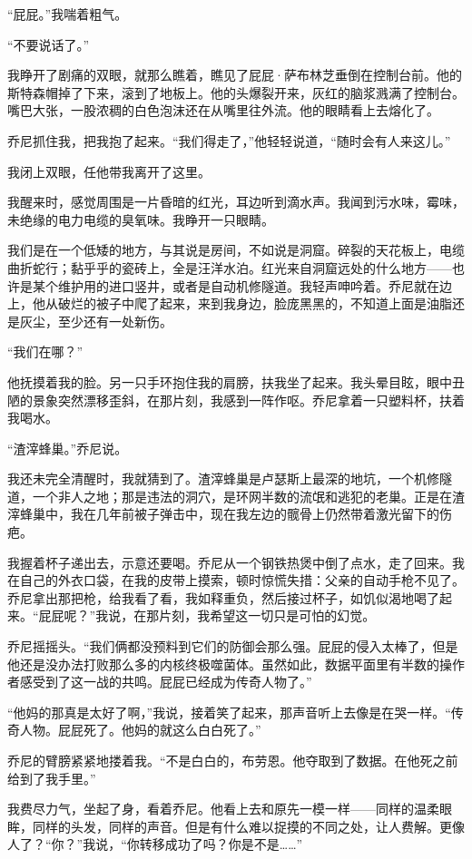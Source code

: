 \documentclass[AutoFakeBold=true]{book}
\begin{document}
``屁屁。''我喘着粗气。

``不要说话了。''

我睁开了剧痛的双眼，就那么瞧着，瞧见了屁屁·萨布林芝垂倒在控制台前。他的斯特森帽掉了下来，滚到了地板上。他的头爆裂开来，灰红的脑浆溅满了控制台。嘴巴大张，一股浓稠的白色泡沫还在从嘴里往外流。他的眼睛看上去熔化了。

乔尼抓住我，把我抱了起来。``我们得走了，''他轻轻说道，``随时会有人来这儿。''

我闭上双眼，任他带我离开了这里。

\vspace*{1em}

我醒来时，感觉周围是一片昏暗的红光，耳边听到滴水声。我闻到污水味，霉味，未绝缘的电力电缆的臭氧味。我睁开一只眼睛。

我们是在一个低矮的地方，与其说是房间，不如说是洞窟。碎裂的天花板上，电缆曲折蛇行；黏乎乎的瓷砖上，全是汪洋水泊。红光来自洞窟远处的什么地方——也许是某个维护用的进口竖井，或者是自动机修隧道。我轻声呻吟着。乔尼就在边上，他从破烂的被子中爬了起来，来到我身边，脸庞黑黑的，不知道上面是油脂还是灰尘，至少还有一处新伤。

``我们在哪？''

他抚摸着我的脸。另一只手环抱住我的肩膀，扶我坐了起来。我头晕目眩，眼中丑陋的景象突然漂移歪斜，在那片刻，我感到一阵作呕。乔尼拿着一只塑料杯，扶着我喝水。

``渣滓蜂巢。''乔尼说。

我还未完全清醒时，我就猜到了。渣滓蜂巢是卢瑟斯上最深的地坑，一个机修隧道，一个非人之地；那是违法的洞穴，是环网半数的流氓和逃犯的老巢。正是在渣滓蜂巢中，我在几年前被子弹击中，现在我左边的髋骨上仍然带着激光留下的伤疤。

我握着杯子递出去，示意还要喝。乔尼从一个钢铁热煲中倒了点水，走了回来。我在自己的外衣口袋，在我的皮带上摸索，顿时惊慌失措：父亲的自动手枪不见了。乔尼拿出那把枪，给我看了看，我如释重负，然后接过杯子，如饥似渴地喝了起来。``屁屁呢？''我说，在那片刻，我希望这一切只是可怕的幻觉。

乔尼摇摇头。``我们俩都没预料到它们的防御会那么强。屁屁的侵入太棒了，但是他还是没办法打败那么多的内核终极噬菌体。虽然如此，数据平面里有半数的操作者感受到了这一战的共鸣。屁屁已经成为传奇人物了。''

``他妈的那真是太好了啊，''我说，接着笑了起来，那声音听上去像是在哭一样。``传奇人物。屁屁死了。他妈的就这么白白死了。''

乔尼的臂膀紧紧地搂着我。``不是白白的，布劳恩。他夺取到了数据。在他死之前给到了我手里。''

我费尽力气，坐起了身，看着乔尼。他看上去和原先一模一样——同样的温柔眼眸，同样的头发，同样的声音。但是有什么难以捉摸的不同之处，让人费解。更像人了？``你？''我说，``你转移成功了吗？你是不是……''
\end{document}
